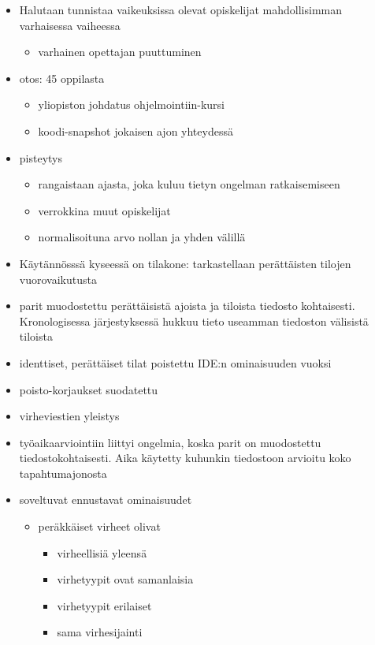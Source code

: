 \documentclass[finnish,twoside,openright]{HYgraduMLDS}
\begin{document}
\begin{itemize}
    \item Halutaan tunnistaa vaikeuksissa olevat opiskelijat mahdollisimman varhaisessa vaiheessa
    \begin{itemize}
        \item varhainen opettajan puuttuminen
    \end{itemize}
    \item otos: 45 oppilasta
    \begin{itemize}
        \item yliopiston johdatus ohjelmointiin-kursi
        \item koodi-snapshot jokaisen ajon yhteydessä
    \end{itemize}
    \item pisteytys
    \begin{itemize}
        \item rangaistaan ajasta, joka kuluu tietyn ongelman ratkaisemiseen
        \item verrokkina muut opiskelijat
        \item normalisoituna arvo nollan ja yhden välillä
    \end{itemize}
    \item Käytännösssä kyseessä on tilakone: tarkastellaan perättäisten tilojen vuorovaikutusta
    \item parit muodostettu perättäisistä ajoista ja tiloista tiedosto kohtaisesti. Kronologisessa järjestyksessä hukkuu tieto useamman tiedoston välisistä tiloista
    \item identtiset, perättäiset tilat poistettu IDE:n ominaisuuden vuoksi
    \item poisto-korjaukset suodatettu
    \item virheviestien yleistys
    \item työaikaarviointiin liittyi ongelmia, koska parit on muodostettu tiedostokohtaisesti. Aika käytetty kuhunkin tiedostoon arvioitu koko tapahtumajonosta
    \item soveltuvat ennustavat ominaisuudet
    \begin{itemize}
        \item peräkkäiset virheet olivat
        \begin{itemize}
            \item virheellisiä yleensä
            \item virhetyypit ovat samanlaisia
            \item virhetyypit erilaiset
            \item sama virhesijainti

\end{itemize}
\end{itemize}
\end{itemize}
\end{document}
